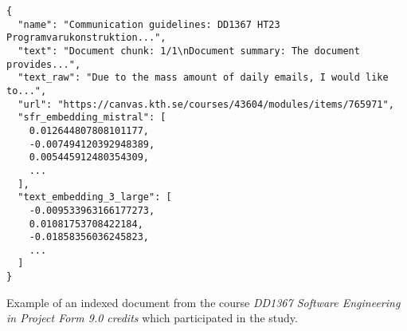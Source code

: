 \begin{listing}[H]
\centering
\renewcommand{\theFancyVerbLine}{\scriptsize\arabic{FancyVerbLine}}
\scriptsize
\begin{verbatim}
{
  "name": "Communication guidelines: DD1367 HT23 Programvarukonstruktion...",
  "text": "Document chunk: 1/1\nDocument summary: The document provides...",
  "text_raw": "Due to the mass amount of daily emails, I would like to...",
  "url": "https://canvas.kth.se/courses/43604/modules/items/765971",
  "sfr_embedding_mistral": [
    0.012644807808101177,
    -0.007494120392948389,
    0.005445912480354309,
    ...
  ],
  "text_embedding_3_large": [
    -0.009533963166177273,
    0.01081753708422184,
    -0.01858356036245823,
    ...
  ]
}
\end{verbatim}
\caption{Example of an indexed document from the course \textit{DD1367 Software Engineering in Project Form 9.0 credits} which participated in the study.}
\label{fig:indexed_document}
\end{listing}
